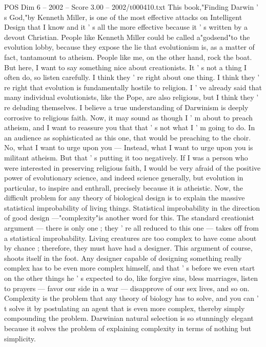 \begin{textsample}{POS Dim 6 – 2002 – Score 3.00 – 2002/t000410.txt}
This book,"Finding Darwin ' s God,"by Kenneth Miller, is one of the most effective attacks on Intelligent Design that I know and it ' s all the more effective because it ' s written by a devout Christian.
People like Kenneth Miller could be called a"godsend"to the evolution lobby, because they expose the lie that evolutionism is, as a matter of fact, tantamount to atheism.
People like me, on the other hand, rock the boat.
But here, I want to say something nice about creationists.
It ' s not a thing I often do, so listen carefully.
I think they ' re right about one thing.
I think they ' re right that evolution is fundamentally hostile to religion.
I ' ve already said that many individual evolutionists, like the Pope, are also religious, but I think they ' re deluding themselves.
I believe a true understanding of Darwinism is deeply corrosive to religious faith.
Now, it may sound as though I ' m about to preach atheism, and I want to reassure you that that ' s not what I ' m going to do.
In an audience as sophisticated as this one, that would be preaching to the choir.
No, what I want to urge upon you — Instead, what I want to urge upon you is militant atheism.
But that ' s putting it too negatively.
If I was a person who were interested in preserving religious faith, I would be very afraid of the positive power of evolutionary science, and indeed science generally, but evolution in particular, to inspire and enthrall, precisely because it is atheistic.
Now, the difficult problem for any theory of biological design is to explain the massive statistical improbability of living things.
Statistical improbability in the direction of good design —"complexity"is another word for this.
The standard creationist argument — there is only one ; they ' re all reduced to this one — takes off from a statistical improbability.
Living creatures are too complex to have come about by chance ; therefore, they must have had a designer.
This argument of course, shoots itself in the foot.
Any designer capable of designing something really complex has to be even more complex himself, and that ' s before we even start on the other things he ' s expected to do, like forgive sins, bless marriages, listen to prayers — favor our side in a war — disapprove of our sex lives, and so on.
Complexity is the problem that any theory of biology has to solve, and you can ' t solve it by postulating an agent that is even more complex, thereby simply compounding the problem.
Darwinian natural selection is so stunningly elegant because it solves the problem of explaining complexity in terms of nothing but simplicity.

\end{textsample}

